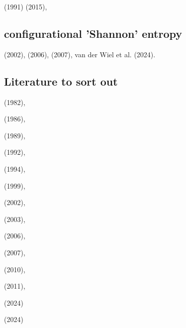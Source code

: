 \Literature

\textcite{pier91} (1991)
\textcite{cobs15} (2015),

\subsection{configurational 'Shannon' entropy}

\textcite{gobo02} (2002), 
\textcite{cakm06} (2006),
\textcite{nake07} (2007), 
van der Wiel et al. (2024). 



\subsection{Literature to sort out}


\textcite{ridn82} (1982),

\textcite{gurn86} (1986),

\textcite{chri89} (1989),

\textcite{hayk92} (1992),

\textcite{scha94} (1994),

\textcite{vazh99} (1999),

\textcite{falt02} (2002),

\textcite{fasa03} (2003),

\textcite{cosc06} (2006),

\textcite{huda07b} (2007),

\textcite{mang10} (2010),

\textcite{saad11} (2011),

\textcite{vavt24} (2024)

\textcite{thsf24} (2024)


